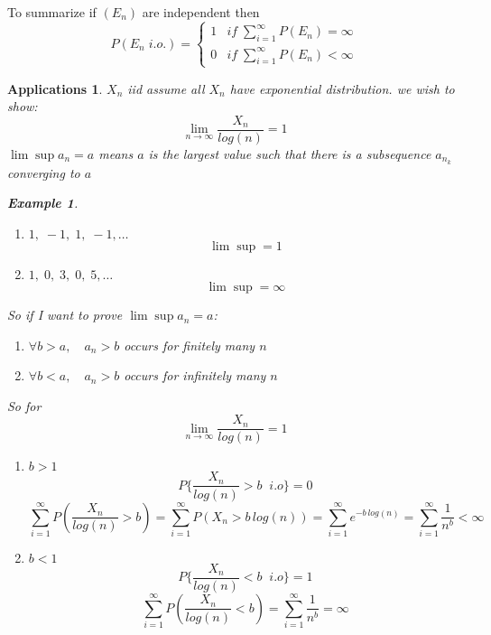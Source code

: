 \documentclass[12pt]{article}
\newtheorem{example}{Example}[section]
\newtheorem*{ap}{Applications}
\begin{document}
To summarize if $(E_n)$ are independent then
\[P(E_n \; i.o.) = \begin{cases} 1 &if \;  \sum\limits_{i=1}^{\infty}P(E_n) =\infty\\
0 & if \; \sum\limits_{i=1}^{\infty}P(E_n) < \infty \end{cases} \]
\begin{ap}
$X_n$ iid assume all $X_n$ have exponential distribution. we wish to show:
\[\lim_{n \rightarrow \infty}\frac{X_n}{log(n)} = 1\]
$\lim\sup a_n =a$ means $a$ is the largest value such that there is a subsequence $a_{n_k}$ converging to $a$
\begin{example}\quad\\
\begin{enumerate}
\item $1,\;-1,\;1,\;-1,\dots$
\[\lim\sup = 1\]
\item $1,\;0,\;3,\;0, \; 5, \dots$
\[\lim\sup = \infty\]
\end{enumerate}

\end{example}

So if I want to prove $\lim\sup a_n=a$:
\begin{enumerate}
\item $\forall b>a,\quad a_n>b$ occurs for finitely many $n$
\item $\forall b<a,\quad a_n>b$ occurs for infinitely many $n$
\end{enumerate}
So for 
\[\lim_{n \rightarrow \infty}\frac{X_n}{log(n)} = 1\]
\begin{enumerate}
\item $b>1$
\[P\{\frac{X_n}{log(n)} >b \;\;i.o\} =0\]
\[\sum_{i=1}^{\infty}P(\frac{X_n}{log(n)}>b) = \sum_{i=1}^{\infty}P(X_n>b\,log(n))= \sum_{i=1}^{\infty}e^{-b\,log(n)} = \sum_{i=1}^{\infty}\frac{1}{n^b}<\infty\]
\item $b<1$
\[P\{\frac{X_n}{log(n)} <b \; \;i.o\} =1\]
\[\sum_{i=1}^{\infty}P(\frac{X_n}{log(n)}<b)= \sum_{i=1}^{\infty}\frac{1}{n^b}=\infty\]
\end{enumerate}
\end{ap}
\end{document}
